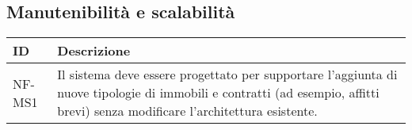 \subsection*{Manutenibilità e scalabilità}

\begin{table}[H]
    \centering
    \renewcommand{\arraystretch}{1.3} %
    \begin{tabular}{|p{3cm}|p{10cm}|} 
        \hline
        \textbf{ID} & \textbf{Descrizione} \\  
        \hline
        NF-MS1 & Il sistema deve essere progettato per supportare l’aggiunta di nuove tipologie di immobili
        e contratti (ad esempio, affitti brevi) senza modificare l’architettura esistente. \\ 
        \hline
    \end{tabular}
\end{table}